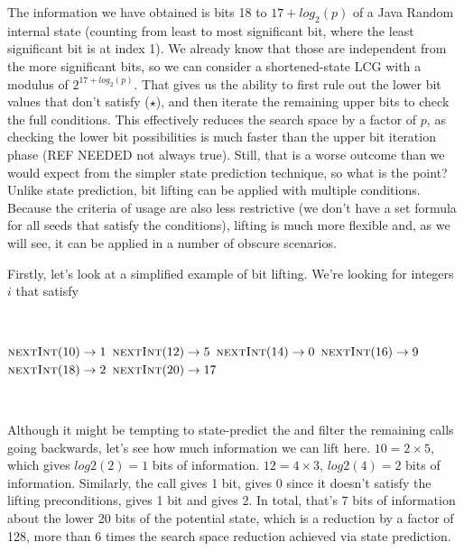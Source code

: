 \documentclass{article}
\begin{document}
The information we have obtained is bits 18 to $17 + log_2(p)$ of a Java Random internal state (counting from least to most significant bit, where the least significant bit is at index 1). We already know that those are independent from the more significant bits, so we can consider a shortened-state LCG with a modulus of $2^{17+log_2(p)}$. That gives us the ability to first rule out the lower bit values that don’t satisfy ($\star$), and then iterate the remaining upper bits to check the full conditions. This effectively reduces the search space by a factor of $p$, as checking the lower bit possibilities is much faster than the upper bit iteration phase (REF NEEDED not always true). Still, that is a worse outcome than we would expect from the simpler state prediction technique, so what is the point? Unlike state prediction, bit lifting can be applied with multiple conditions. Because the criteria of usage are also less restrictive (we don’t have a set formula for all seeds that satisfy the conditions), lifting is much more flexible and, as we will see, it can be applied in a number of obscure scenarios.

Firstly, let’s look at a simplified example of bit lifting. We’re looking for integers $i$ that satisfy

\
\begin{algorithmic}
\State {}
\State $\Call{nextInt}{10} \to 1$
\State $\Call{nextInt}{12} \to 5$
\State $\Call{nextInt}{14} \to 0$
\State $\Call{nextInt}{16} \to 9$
\State $\Call{nextInt}{18} \to 2$
\State $\Call{nextInt}{20} \to 17$
\end{algorithmic}
\ \

Although it might be tempting to state-predict the  and filter the remaining calls going backwards, let’s see how much information we can lift here. $10 = 2 \times 5$, which gives $log2(2) = 1$ bits of information. $12 = 4 \times 3$, $log2(4) = 2$ bits of information. Similarly, the  call gives 1 bit,  gives 0 since it doesn’t satisfy the lifting preconditions,  gives 1 bit and  gives 2. In total, that’s 7 bits of information about the lower 20 bits of the potential state, which is a reduction by a factor of 128, more than 6 times the search space reduction achieved via state prediction. %

\end{document}
